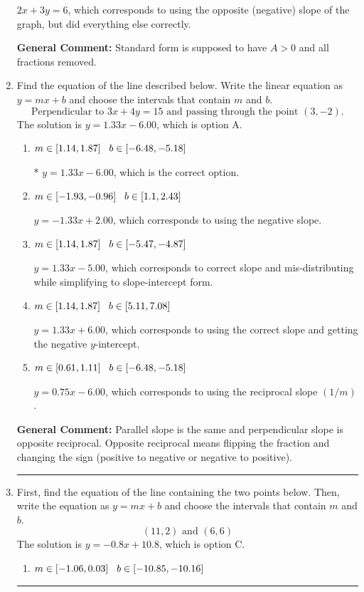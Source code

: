 \documentclass{extbook}[14pt]
\newcommand{\litem}[1]{\item #1

\rule{\textwidth}{0.4pt}}
\begin{document}
\begin{enumerate}
{\begin{enumerate}[label=\Alph*.]
 $2x + 3y = 6$, which corresponds to using the opposite (negative) slope of the graph, but did everything else correctly.
\end{enumerate}

\textbf{General Comment:} Standard form is supposed to have $A > 0$ and all fractions removed.
}
\litem{
Find the equation of the line described below. Write the linear equation as $ y=mx+b $ and choose the intervals that contain $m$ and $b$.
\[ \text{Perpendicular to } 3 x + 4 y = 15 \text{ and passing through the point } (3, -2). \]The solution is \( y = 1.33x - 6.00 \), which is option A.\begin{enumerate}[label=\Alph*.]
\item \( m \in [1.14, 1.87] \hspace*{3mm} b \in [-6.48, -5.18] \)

* $y = 1.33x - 6.00$, which is the correct option.
\item \( m \in [-1.93, -0.96] \hspace*{3mm} b \in [1.1, 2.43] \)

 $y = -1.33x + 2.00$, which corresponds to using the negative slope.
\item \( m \in [1.14, 1.87] \hspace*{3mm} b \in [-5.47, -4.87] \)

 $y = 1.33x - 5.00$, which corresponds to correct slope and mis-distributing while simplifying to slope-intercept form.
\item \( m \in [1.14, 1.87] \hspace*{3mm} b \in [5.11, 7.08] \)

 $y = 1.33x + 6.00$, which corresponds to using the correct slope and getting the negative $y$-intercept.
\item \( m \in [0.61, 1.11] \hspace*{3mm} b \in [-6.48, -5.18] \)

 $y = 0.75x - 6.00$, which corresponds to using the reciprocal slope $(1/m)$.
\end{enumerate}

\textbf{General Comment:} Parallel slope is the same and perpendicular slope is opposite reciprocal. Opposite reciprocal means flipping the fraction and changing the sign (positive to negative or negative to positive).
}
\litem{
First, find the equation of the line containing the two points below. Then, write the equation as $ y=mx+b $ and choose the intervals that contain $m$ and $b$.
\[ (11, 2) \text{ and } (6, 6) \]The solution is \( y = -0.8x + 10.8 \), which is option C.\begin{enumerate}[label=\Alph*.]
\item \( m \in [-1.06, 0.03] \hspace*{3mm} b \in [-10.85, -10.16] \)


\end{enumerate}}
\end{enumerate}
\end{document}
